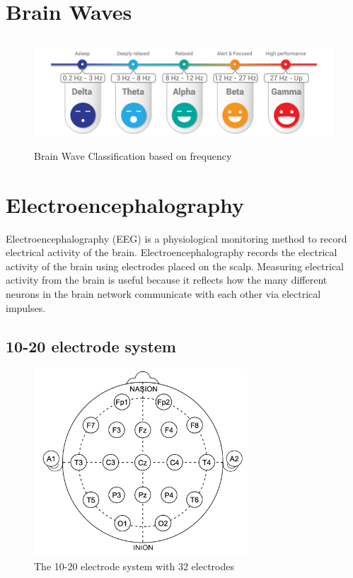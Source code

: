 \section{Brain Waves}
\begin{figure}[H]
\centering
\includegraphics[height=4cm]{Pictures/brainwavefrequencies.png}
\caption{Brain Wave Classification based on frequency}
\label{fig11}
\end{figure}

\section{Electroencephalography}

Electroencephalography (EEG) is a physiological monitoring method to record electrical activity of the brain. Electroencephalography records the electrical activity of the brain using electrodes placed on the scalp. Measuring electrical activity from the brain is useful because it reflects how the many different neurons in the brain network communicate with each other via electrical impulses.

\subsection{10-20 electrode system}
\begin{figure}[H]
\centering
\includegraphics[height=7cm]{Pictures/1020.png}
\caption{The 10-20 electrode system with 32 electrodes}
\label{fig12}
\end{figure}

